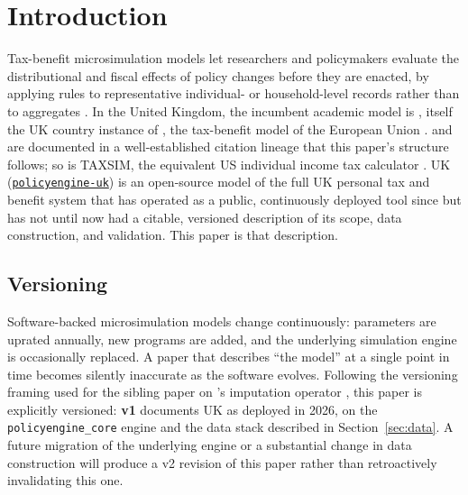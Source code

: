 \section{Introduction}
\label{sec:introduction}

Tax-benefit microsimulation models let researchers and policymakers evaluate
the distributional and fiscal effects of policy changes before they are
enacted, by applying rules to representative individual- or household-level
records rather than to aggregates \citep{bourguignon2006microsimulation}. In
the United Kingdom, the incumbent academic model is \ukmod{}, itself the UK
country instance of \euromod{}, the tax-benefit model of the European
Union \citep{sutherland2013euromod}. \ukmod{} and \euromod{} are documented
in a well-established citation lineage that this paper's structure follows;
so is \textsc{TAXSIM}, the equivalent US individual income tax calculator
\citep{feenberg1993taxsim}. \policyengine{} UK
(\texttt{\href{https://github.com/PolicyEngine/policyengine-uk}{policyengine-uk}})
is an open-source model of the full UK personal tax and benefit system that
has operated as a public, continuously deployed tool since  but has
not until now had a citable, versioned description of its scope, data
construction, and validation. This paper is that description.


\subsection{Versioning}

Software-backed microsimulation models change continuously: parameters are
uprated annually, new programs are added, and the underlying simulation
engine is occasionally replaced. A paper that describes ``the model'' at a
single point in time becomes silently inaccurate as the software evolves.
Following the versioning framing used for the sibling paper on
\microcosm{}'s imputation operator \citep{populace2026}, this paper is
explicitly versioned: \textbf{v1} documents \policyengine{} UK as deployed in
2026, on the \texttt{policyengine\_core} engine and the \microcosm{} data
stack described in Section~\ref{sec:data}. A future migration of the
underlying engine or a substantial change in data construction will produce a
v2 revision of this paper rather than retroactively invalidating this one.

